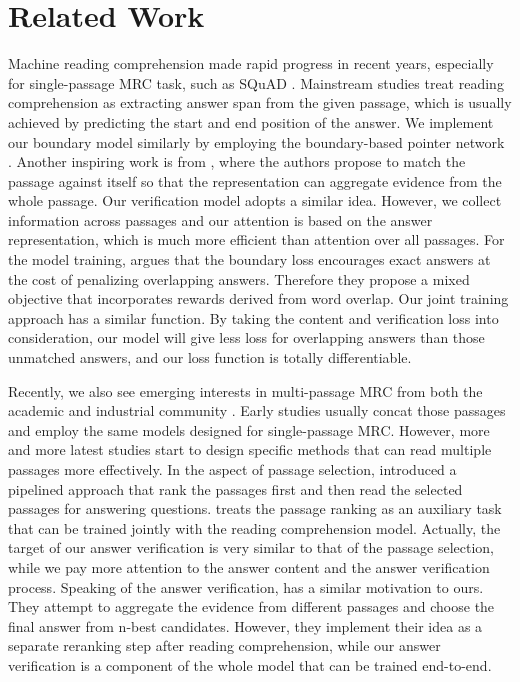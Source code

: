 \documentclass[11pt,a4paper]{article}
\begin{document}
 
\section{Related Work}
\label{related}



Machine reading comprehension made rapid progress in recent years, especially for single-passage MRC task, such as SQuAD \cite{squad}. Mainstream studies \cite{bidaf, match-lstm, dcn} treat reading comprehension as extracting answer span from the given passage, which is usually achieved by predicting the start and end position of the answer.  We implement our boundary model similarly by employing the boundary-based pointer network \cite{match-lstm}. Another inspiring work is from , where the authors  propose to match the passage against itself so that the representation can aggregate evidence from the whole passage. Our verification model adopts a similar idea. However, we collect information across passages and our attention is based on the answer representation, which is much more efficient than attention over all passages. For the model training,  argues that  the boundary loss encourages exact answers at the cost of penalizing overlapping answers. Therefore they propose a mixed objective that incorporates rewards derived from word overlap. Our joint training approach has a similar function. By taking the content and verification loss into consideration, our model will give less loss for overlapping answers than those unmatched answers, and our loss function is totally differentiable. 






Recently, we also see emerging interests in multi-passage MRC from both the academic \cite{searchqa, triviaqa} and industrial community \cite{marco, dureader}. Early studies \cite{reasonet, rnet} usually concat those passages and employ the same models designed for single-passage MRC. However, more and more latest studies start to design specific methods that can read multiple passages more effectively. In the aspect of passage selection,  introduced a pipelined approach that rank the passages first and then read the selected passages for answering questions.   treats the passage ranking as an auxiliary task that can be trained jointly with the reading comprehension model. Actually, the target of our answer verification is very similar to that of the passage selection, while we pay more attention to the answer content and the answer verification process. Speaking of the answer verification,  has a similar motivation to ours. They attempt to aggregate the evidence from different passages and choose the final answer from n-best candidates. However, they implement their idea as a separate reranking step after reading comprehension, while our answer verification is a component of the whole model that can be trained end-to-end. 
\end{document}
